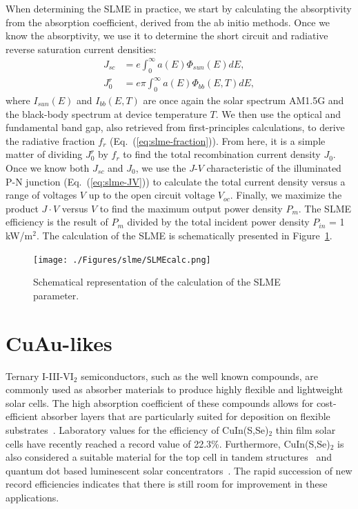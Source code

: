 \begin{refsection}
When determining the SLME in practice, we start by calculating the 
absorptivity from the absorption coefficient, derived from the ab initio 
methods. Once we know the absorptivity, we use it to determine the short 
circuit and radiative reverse saturation current densities: 
\begin{equation} \label{eq:slme-currents} 
\begin{aligned} 
J_{sc} &= e \int_0^\infty a(E)  \Phi_{sun} (E) dE, 
\\ J_0^r &= e\pi \int_0^\infty a(E)  \Phi_{bb} (E,T) dE, 
\end{aligned} 
\end{equation} 
where $I_{sun}(E)$ and $I_{bb}(E,T)$ are once again the solar spectrum AM1.5G  
and the black-body spectrum at device temperature $T$. We then use the optical 
and fundamental band gap, also retrieved from first-principles calculations, 
to derive the radiative fraction $f_r$ (Eq.~(\ref{eq:slme-fraction})). From 
here, it is a simple matter of dividing $J_0^r$ by $f_r$ to find the total 
recombination current density $J_0$. Once we know both $J_{sc}$ and $J_0$, we 
use the $J$-$V$ characteristic of the illuminated P-N junction 
(Eq.~(\ref{eq:slme-JV})) to calculate the total current density versus a range 
of voltages $V$ up to the open circuit voltage $V_{oc}$. Finally, we maximize 
the product $J\cdot V$ versus $V$ to find the maximum output power density 
$P_m$. The SLME efficiency is the result of $P_m$ divided by the total 
incident power density $P_{in}$ = 1 kW/m$^2$. The calculation of the SLME is 
schematically presented in Figure~\ref{fig:slme-SLMEcalc}. 
 
\begin{figure}[h]  
\centering 
\texttt{[image: ./Figures/slme/SLMEcalc.png]} 
\caption{Schematical representation of the calculation of the SLME parameter.} 
\label{fig:slme-SLMEcalc} 
\end{figure} 
 
\section{CuAu-likes} \label{sec:slme-CuAu} 
 
Ternary I-III-VI$_2$ semiconductors, such as the well known 
 compounds, are commonly used as absorber materials to 
produce highly flexible and lightweight solar cells. The high absorption 
coefficient of these compounds allows for cost-efficient absorber layers that 
are particularly suited for deposition on flexible 
substrates~\cite{Reinhard2013}. Laboratory values for the efficiency of 
CuIn(S,Se)$_2$ thin film solar cells have recently reached a record value of 
22.3\%. Furthermore, CuIn(S,Se)$_2$ is also considered a suitable material for 
the top cell in tandem structures~\cite{Cheek2013} and quantum dot based 
luminescent solar concentrators~\cite{Hu2015}. The rapid succession of new 
record efficiencies indicates that there is still room for improvement in 
these applications. 
 

\end{refsection}
